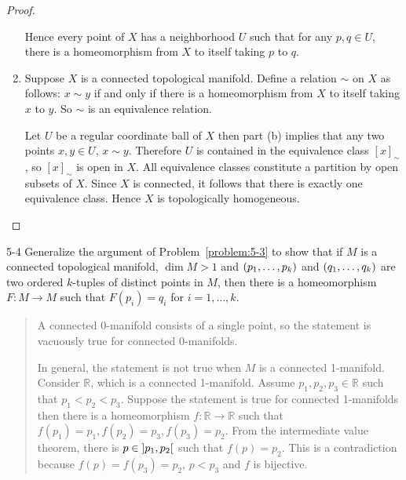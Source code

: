 \begin{proof}
\begin{enumerate}[label={(\alph*)}]
		      Hence every point of \( X \) has a neighborhood \( U \) such that for any \( p, q \in U \), there is a homeomorphism from \( X \) to itself taking \( p \) to \( q \).
		\item Suppose \( X \) is a connected topological manifold. Define a relation \( \sim \) on \( X \) as follows: \( x \sim y \) if and only if there is a homeomorphism from \( X \) to itself taking \( x \) to \( y \). So \( \sim \) is an equivalence relation.

		      Let \( U \) be a regular coordinate ball of \( X \) then part (b) implies that any two points \( x, y\in U \), \( x \sim y \). Therefore \( U \) is contained in the equivalence class \( {[x]}_{\sim} \), so \( {[x]}_{\sim} \) is open in \( X \). All equivalence classes constitute a partition by open subsets of \( X \). Since \( X \) is connected, it follows that there is exactly one equivalence class. Hence \( X \) is topologically homogeneous.
	\end{enumerate}
\end{proof}

\begin{problem}{5-4}\label{problem:5-4}
Generalize the argument of Problem~\ref{problem:5-3} to show that if \( M \) is a connected topological manifold, \( \dim M > 1 \) and \( \left({p_{1}, \ldots, p_{k}}\right) \) and \( \left({q_{1}, \ldots, q_{k}}\right) \) are two ordered \( k \)-tuples of distinct points in \( M \), then there is a homeomorphism \( F: M \to M \) such that \( F(p_{i}) = q_{i} \) for \( i = 1, \ldots, k \).
\end{problem}

\begin{quote}
	A connected 0-manifold consists of a single point, so the statement is vacuously true for connected 0-manifolds.

	In general, the statement is not true when \( M \) is a connected 1-manifold. Consider \( \mathbb{R} \), which is a connected 1-manifold. Assume \( p_{1}, p_{2}, p_{3}\in \mathbb{R} \) such that \( p_{1} < p_{2} < p_{3} \). Suppose the statement is true for connected 1-manifolds then there is a homeomorphism \( f: \mathbb{R} \to \mathbb{R} \) such that \( f(p_{1}) = p_{1}, f(p_{2}) = p_{3}, f(p_{3}) = p_{2} \). From the intermediate value theorem, there is \( p \in \left]{p_{1}, p_{2}}\right[ \) such that \( f(p) = p_{2} \). This is a contradiction because \( f(p) = f(p_{3}) = p_{2} \), \( p < p_{3} \) and \( f \) is bijective.
\end{quote}

